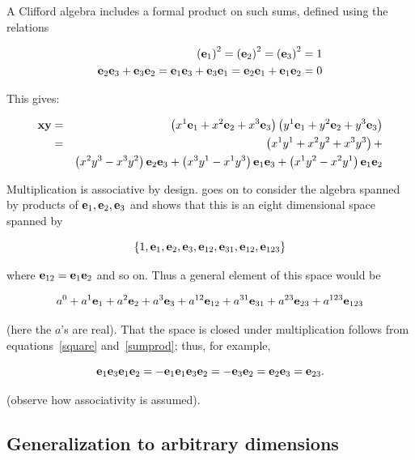 \documentclass{article}
\begin{document}
A Clifford algebra includes a formal product on such sums, defined using the
relations

\begin{eqnarray}\label{square}
\left({\bf e}_{1}\right)^2=
\left({\bf e}_{2}\right)^2=
\left({\bf e}_{3}\right)^2=1\\
{\bf e}_{2}{\bf e}_{3} + {\bf e}_{3}{\bf e}_{2} = \label{sumprod}
{\bf e}_{1}{\bf e}_{3} + {\bf e}_{3}{\bf e}_{1} = 
{\bf e}_{2}{\bf e}_{1} + {\bf e}_{1}{\bf e}_{2} = 0
\end{eqnarray}

This gives:
  
\begin{eqnarray}
{\bf x}{\bf y} &=&
\left(x^1{\bf e}_{1} + x^2{\bf e}_{2} + x^3{\bf e}_{3}\right)
\left(y^1{\bf e}_{1} + y^2{\bf e}_{2} + y^3{\bf e}_{3}\right)\nonumber\\
&=& \left(x^1y^1+x^2y^2+x^3y^3\right) +\nonumber\\&&
       \left(x^2y^3-x^3y^2\right){\bf e}_{2}{\bf e}_{3} + 
       \left(x^3y^1-x^1y^3\right){\bf e}_{1}{\bf e}_{3} + 
       \left(x^1y^2-x^2y^1\right){\bf e}_{1}{\bf e}_{2}
\end{eqnarray}
  
Multiplication is associative by design.  \citeauthor{snygg2010} goes
on to consider the algebra spanned by products of
${\bf e}_{1},{\bf e}_{2},{\bf e}_{3}$ and shows that this is an eight dimensional
space spanned by

\begin{equation}
\left\{
1,{\bf e}_{1},{\bf e}_{2},{\bf e}_{3},{\bf e}_{12},{\bf e}_{31},{\bf e}_{12},{\bf e}_{123}
\right\}
\end{equation}

where ${\bf e}_{12}={\bf e}_{1}{\bf e}_{2}$ and so on.  Thus a general element of
this space would be

\begin{equation}
a^0+
a^1{\bf e}_{1} + a^2{\bf e}_{2} + a^3{\bf e}_{3} +
a^{12}{\bf e}_{12} + a^{31}{\bf e}_{31} + a^{23}{\bf e}_{23} +
a^{123}{\bf e}_{123}
\end{equation}

(here the $a$'s are real).  That the space is closed under
multiplication follows from equations~\ref{square} and~\ref{sumprod};
thus, for example,

\begin{equation}
  {\bf e}_{1}{\bf e}_{3}{\bf e}_{1}{\bf e}_{2}=
 -{\bf e}_{1}{\bf e}_{1}{\bf e}_{3}{\bf e}_{2}=
 -{\bf e}_{3}{\bf e}_{2}=
  {\bf e}_{2}{\bf e}_{3}={\bf e}_{23}.
  \end{equation}

(observe how associativity is assumed).

\subsection{Generalization to arbitrary dimensions}
\end{document}
